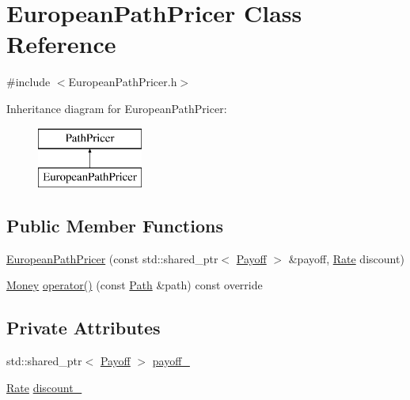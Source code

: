 \hypertarget{class_european_path_pricer}{}\section{European\+Path\+Pricer Class Reference}
\label{class_european_path_pricer}


{\ttfamily \#include $<$European\+Path\+Pricer.\+h$>$}

Inheritance diagram for European\+Path\+Pricer\+:\begin{figure}[H]
\begin{center}
\leavevmode
\includegraphics[height=2.000000cm]{class_european_path_pricer}
\end{center}
\end{figure}
\subsection*{Public Member Functions}
\begin{DoxyCompactItemize}
\item 
\hyperlink{class_european_path_pricer_aa571bb1652a0d7e4f97d3d58e7c8b295}{European\+Path\+Pricer} (const std\+::shared\+\_\+ptr$<$ \hyperlink{class_payoff}{Payoff} $>$ \&payoff, \hyperlink{_name_def_8h_a25bee43a162de339c81f3d1caf6b887d}{Rate} discount)
\item 
\hyperlink{_name_def_8h_a5a9d48c16a694e9a2d9f1eca730dc8c5}{Money} \hyperlink{class_european_path_pricer_ac12142089ccdc7fe73ba93d66a7964e6}{operator()} (const \hyperlink{class_path}{Path} \&path) const override
\end{DoxyCompactItemize}
\subsection*{Private Attributes}
\begin{DoxyCompactItemize}
\item 
std\+::shared\+\_\+ptr$<$ \hyperlink{class_payoff}{Payoff} $>$ \hyperlink{class_european_path_pricer_a2023ec56bae32c6db123e8d400d2b0cf}{payoff\+\_\+}
\item 
\hyperlink{_name_def_8h_a25bee43a162de339c81f3d1caf6b887d}{Rate} \hyperlink{class_european_path_pricer_a1bb1874fe4f263bff17a998f0ec9588c}{discount\+\_\+}
\end{DoxyCompactItemize}


